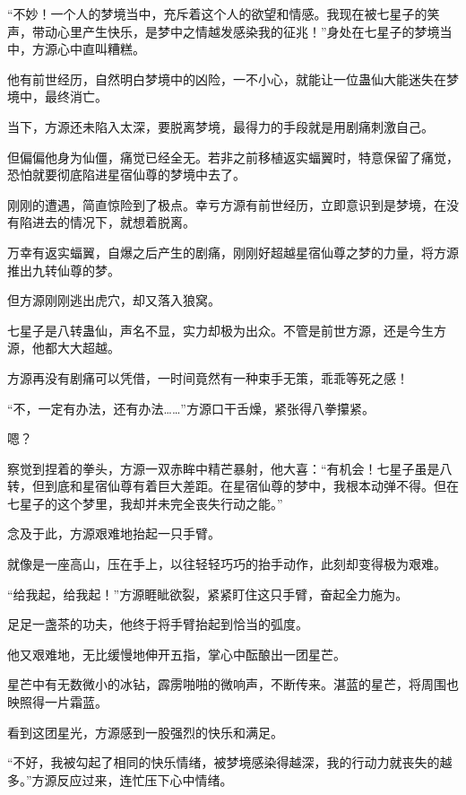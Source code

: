 
\begin{this_body}



“不妙！一个人的梦境当中，充斥着这个人的欲望和情感。我现在被七星子的笑声，带动心里产生快乐，是梦中之情越发感染我的征兆！”身处在七星子的梦境当中，方源心中直叫糟糕。

他有前世经历，自然明白梦境中的凶险，一不小心，就能让一位蛊仙大能迷失在梦境中，最终消亡。

当下，方源还未陷入太深，要脱离梦境，最得力的手段就是用剧痛刺激自己。

但偏偏他身为仙僵，痛觉已经全无。若非之前移植返实蝠翼时，特意保留了痛觉，恐怕就要彻底陷进星宿仙尊的梦境中去了。

刚刚的遭遇，简直惊险到了极点。幸亏方源有前世经历，立即意识到是梦境，在没有陷进去的情况下，就想着脱离。

万幸有返实蝠翼，自爆之后产生的剧痛，刚刚好超越星宿仙尊之梦的力量，将方源推出九转仙尊的梦。

但方源刚刚逃出虎穴，却又落入狼窝。

七星子是八转蛊仙，声名不显，实力却极为出众。不管是前世方源，还是今生方源，他都大大超越。

方源再没有剧痛可以凭借，一时间竟然有一种束手无策，乖乖等死之感！

“不，一定有办法，还有办法……”方源口干舌燥，紧张得八拳攥紧。

嗯？

察觉到捏着的拳头，方源一双赤眸中精芒暴射，他大喜：“有机会！七星子虽是八转，但到底和星宿仙尊有着巨大差距。在星宿仙尊的梦中，我根本动弹不得。但在七星子的这个梦里，我却并未完全丧失行动之能。”

念及于此，方源艰难地抬起一只手臂。

就像是一座高山，压在手上，以往轻轻巧巧的抬手动作，此刻却变得极为艰难。

“给我起，给我起！”方源睚眦欲裂，紧紧盯住这只手臂，奋起全力施为。

足足一盏茶的功夫，他终于将手臂抬起到恰当的弧度。

他又艰难地，无比缓慢地伸开五指，掌心中酝酿出一团星芒。

星芒中有无数微小的冰钻，霹雳啪啪的微响声，不断传来。湛蓝的星芒，将周围也映照得一片霜蓝。

看到这团星光，方源感到一股强烈的快乐和满足。

“不好，我被勾起了相同的快乐情绪，被梦境感染得越深，我的行动力就丧失的越多。”方源反应过来，连忙压下心中情绪。


\end{this_body}
